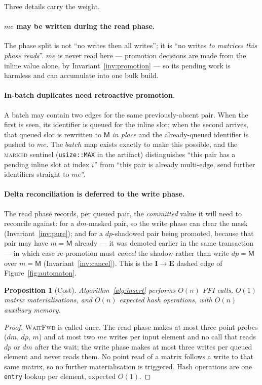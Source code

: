\documentclass[11pt,a4paper]{article}
\theoremstyle{plain}
\newtheorem{proposition}[theorem]{Proposition}
\theoremstyle{definition}
\theoremstyle{remark}
\newcommand{\M}{\mathsf{M}}
\begin{document}
Three details carry the weight.

\paragraph{$me$ may be written during the read phase.}
The phase split is not ``no writes then all writes''; it is ``no writes
\emph{to matrices this phase reads}''. $me$ is never read here --- promotion
decisions are made from the inline value alone, by
Invariant~\ref{inv:promotion} --- so its pending work is harmless and can
accumulate into one bulk build.

\paragraph{In-batch duplicates need retroactive promotion.}
A batch may contain two edges for the same previously-absent pair. When the
first is seen, its identifier is queued for the inline slot; when the second
arrives, that queued slot is rewritten to $\M$ \emph{in place} and the
already-queued identifier is pushed to $me$. The $\mathit{batch}$ map exists
exactly to make this possible, and the \textsc{marked} sentinel
(\texttt{usize::MAX} in the artifact) distinguishes ``this pair has a pending
inline slot at index $i$'' from ``this pair is already multi-edge, send
further identifiers straight to $me$''.

\paragraph{Delta reconciliation is deferred to the write phase.}
The read phase records, per queued pair, the \emph{committed} value it will
need to reconcile against: for a $dm$-masked pair, so the write phase can
clear the mask (Invariant~\ref{inv:pure}); and for a $dp$-shadowed pair being
promoted, because that pair may have $m = \M$ already --- it was demoted
earlier in the same transaction --- in which case re-promotion must
\emph{cancel} the shadow rather than write $dp = \M$ over $m = \M$
(Invariant~\ref{inv:cancel}). This is the $\mathbf{I} \to \mathbf{E}$ dashed
edge of Figure~\ref{fig:automaton}.

\begin{proposition}[Cost]
\label{prop:insertcost}
Algorithm~\ref{alg:insert} performs $O(n)$ FFI calls, $O(1)$ matrix
materialisations, and $O(n)$ expected hash operations, with $O(n)$ auxiliary
memory.
\end{proposition}
\begin{proof}
\textsc{WaitFwd} is called once. The read phase makes at most three point
probes ($dm$, $dp$, $m$) and at most two $me$ writes per input element and no
call that reads $dp$ or $dm$ after the wait; the write phase makes at most
three writes per queued element and never reads them. No point read of a
matrix follows a write to that same matrix, so no further materialisation is
triggered. Hash operations are one \texttt{entry} lookup per element,
expected $O(1)$.
\end{proof}
\end{document}
